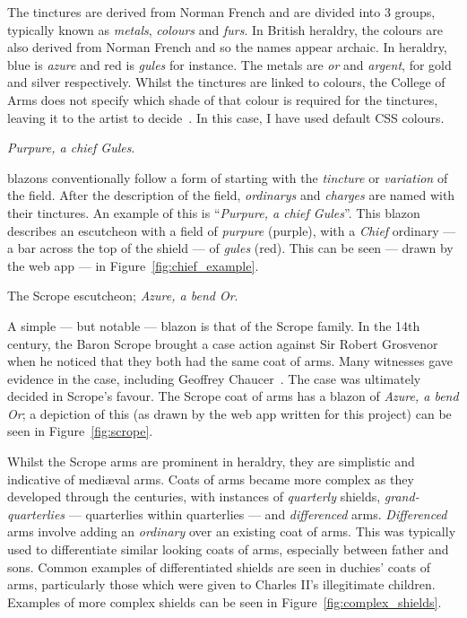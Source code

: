 \documentclass[nobib, a4paper, twoside, justified]{tufte-book}
\makeatletter
\newcommand{\charges}{\glspl{charge}\@\xspace}
\newcommand{\blazon}{\gls{blazon}\@\xspace}
\newcommand{\ublazons}{\Glspl{blazon}\@\xspace}
\makeatother
\begin{document}
The tinctures are derived from Norman French and are divided into 3 groups, typically known as
\textit{metals}, \textit{colours} and \textit{furs}. In British heraldry, the colours are also
derived from Norman French and so the names appear archaic. In heraldry, blue is \textit{azure} and
red is \textit{gules} for instance. The metals are \textit{or} and \textit{argent}, for gold and
silver respectively. Whilst the tinctures are linked to colours, the College of Arms does not
specify which shade of that colour is required for the tinctures, leaving it to the artist to
decide~\autocite{college_of_arms_faq}. In this case, I have used default CSS colours.

\begin{marginfigure}
  \centering
  \def\svgwidth{0.8\linewidth}
  
  \caption{\textit{Purpure, a chief Gules}.}%
  \label{fig:chief_example}
\end{marginfigure}

\ublazons conventionally follow a form of starting with the \textit{\gls{tincture}} or
\textit{\gls{variation}} of the field. After the description of the field,
\textit{\glspl{ordinary}} and \textit{\charges{}} are named with their tinctures. An example of
this is ``\textit{Purpure, a chief Gules}''. This \blazon describes an escutcheon with a field of
\textit{purpure} (purple), with a \textit{Chief} \gls{ordinary} --- a bar across the top of the
shield --- of \textit{gules} (red). This can be seen --- drawn by the web app --- in
Figure~\ref{fig:chief_example}.

\begin{marginfigure}
  \centering
  \def\svgwidth{0.8\linewidth}
  
  \caption{The Scrope \gls{escutcheon}; \textit{Azure, a bend Or}.}%
  \label{fig:scrope}
\end{marginfigure}

A simple --- but notable --- \blazon is that of the Scrope family. In the 14th century, the Baron
Scrope brought a case action against Sir Robert Grosvenor when he noticed that they both had the
same coat of arms. Many witnesses gave evidence in the case, including Geoffrey
Chaucer~\autocite{scrope_grosvenor}. The case was ultimately decided in Scrope's favour. The Scrope
coat of arms has a \blazon of \textit{Azure, a bend Or}; a depiction of this (as drawn by the web
app written for this project) can be seen in Figure~\ref{fig:scrope}.

Whilst the Scrope arms are prominent in heraldry, they are simplistic and indicative of
medi\ae{}val arms. Coats of arms became more complex as they developed through the centuries, with
instances of \textit{quarterly} shields, \textit{grand-quarterlies} --- quarterlies within
quarterlies --- and \textit{differenced} arms. \textit{Differenced} arms involve adding an
\textit{\gls{ordinary}} over an existing coat of arms. This was typically used to differentiate similar
looking coats of arms, especially between father and sons. Common examples of differentiated
shields are seen in duchies' coats of arms, particularly those which were given to Charles II's
illegitimate children. Examples of more complex shields can be seen in
Figure~\ref{fig:complex_shields}.
\end{document}
